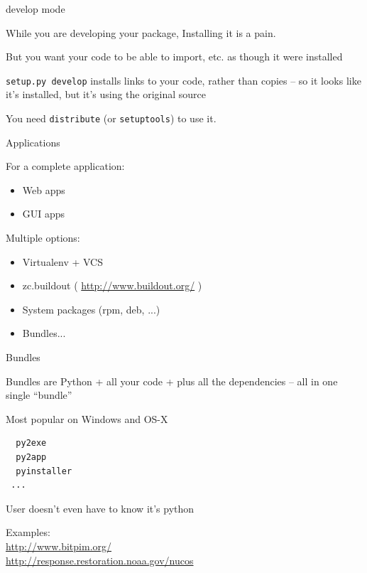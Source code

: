 \documentclass{beamer}
\begin{document}
\begin{frame}[fragile]{develop mode}

{\Large While you are developing your package, Installing it is a pain.}

\vfill
{\Large But you want your code to be able to import, etc. as though it were installed}

\vfill
{\Large \verb|setup.py develop| installs links to your code, rather than copies
 -- so it looks like it's installed, but it's using the original source}

\vfill
{\Large You need \verb|distribute| (or \verb|setuptools|) to use it.}
\vfill
\end{frame} 

\begin{frame}[fragile]{Applications}

{\Large For a complete application:}
\begin{itemize}
  \item Web apps
  \item GUI apps
\end{itemize}

{\Large Multiple options:}
\begin{itemize}
  \item Virtualenv + VCS
  \item zc.buildout ( \url{http://www.buildout.org/} )
  \item System packages (rpm, deb, ...)
  \item Bundles...
\end{itemize}

\end{frame} 

\begin{frame}[fragile]{Bundles}

{\Large
Bundles are Python + all your code + plus all the dependencies --
all in one single ``bundle'' 

\vfill
Most popular on Windows and OS-X
}
\begin{verbatim}
  py2exe
  py2app
  pyinstaller
 ...
\end{verbatim}

{\Large User doesn't even have to know it's python }

\vfill
Examples: \\
\hspace{0.5in} \url{http://www.bitpim.org/} \\
\hspace{0.5in} \url{http://response.restoration.noaa.gov/nucos}

\end{frame} 
\end{document}
